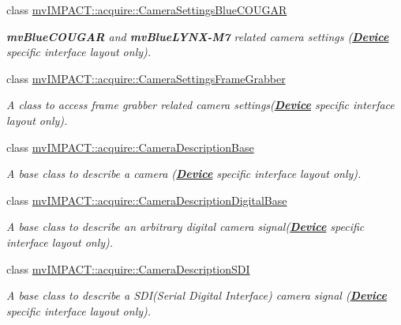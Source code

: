 \begin{DoxyCompactItemize}
class \hyperlink{classmv_i_m_p_a_c_t_1_1acquire_1_1_camera_settings_blue_c_o_u_g_a_r}{mv\+I\+M\+P\+A\+C\+T\+::acquire\+::\+Camera\+Settings\+Blue\+C\+O\+U\+G\+A\+R}
\begin{DoxyCompactList}\small\item\em {\bfseries mv\+Blue\+C\+O\+U\+G\+A\+R} and {\bfseries mv\+Blue\+L\+Y\+N\+X-\/\+M7} related camera settings ({\bfseries \hyperlink{classmv_i_m_p_a_c_t_1_1acquire_1_1_device}{Device}} specific interface layout only). \end{DoxyCompactList}\item 
class \hyperlink{classmv_i_m_p_a_c_t_1_1acquire_1_1_camera_settings_frame_grabber}{mv\+I\+M\+P\+A\+C\+T\+::acquire\+::\+Camera\+Settings\+Frame\+Grabber}
\begin{DoxyCompactList}\small\item\em A class to access frame grabber related camera settings({\bfseries \hyperlink{classmv_i_m_p_a_c_t_1_1acquire_1_1_device}{Device}} specific interface layout only). \end{DoxyCompactList}\item 
class \hyperlink{classmv_i_m_p_a_c_t_1_1acquire_1_1_camera_description_base}{mv\+I\+M\+P\+A\+C\+T\+::acquire\+::\+Camera\+Description\+Base}
\begin{DoxyCompactList}\small\item\em A base class to describe a camera ({\bfseries \hyperlink{classmv_i_m_p_a_c_t_1_1acquire_1_1_device}{Device}} specific interface layout only). \end{DoxyCompactList}\item 
class \hyperlink{classmv_i_m_p_a_c_t_1_1acquire_1_1_camera_description_digital_base}{mv\+I\+M\+P\+A\+C\+T\+::acquire\+::\+Camera\+Description\+Digital\+Base}
\begin{DoxyCompactList}\small\item\em A base class to describe an arbitrary digital camera signal({\bfseries \hyperlink{classmv_i_m_p_a_c_t_1_1acquire_1_1_device}{Device}} specific interface layout only). \end{DoxyCompactList}\item 
class \hyperlink{classmv_i_m_p_a_c_t_1_1acquire_1_1_camera_description_s_d_i}{mv\+I\+M\+P\+A\+C\+T\+::acquire\+::\+Camera\+Description\+S\+D\+I}
\begin{DoxyCompactList}\small\item\em A base class to describe a S\+D\+I(\+Serial Digital Interface) camera signal ({\bfseries \hyperlink{classmv_i_m_p_a_c_t_1_1acquire_1_1_device}{Device}} specific interface layout only). \end{DoxyCompactList}\item 

\end{DoxyCompactItemize}
